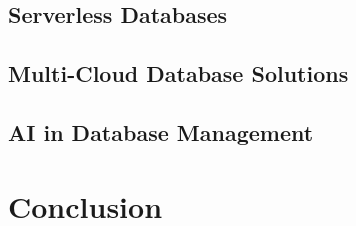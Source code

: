 \documentclass[12pt, a4paper]{article}
\begin{document}
    \subsection{Serverless Databases}
    \subsection{Multi-Cloud Database Solutions}
    \subsection{AI in Database Management}
\clearpage

\section{Conclusion}
\clearpage

\section*{}


\end{document}
